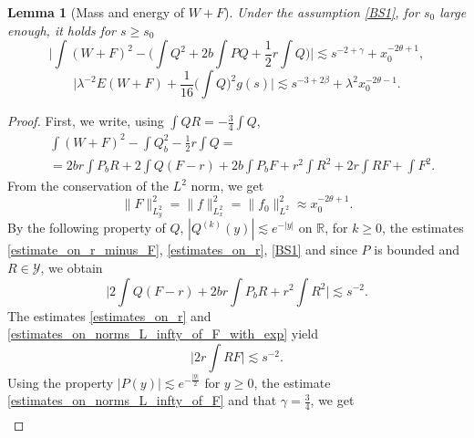 \documentclass[16pt,english, oneside,reqno]{smfart}
\newcommand{\RR}{\mathbb{R}}
\newtheorem{lemma}[theorem]{Lemma}
\begin{document}
\begin{lemma}[Mass and energy of $W+F$]
Under the assumption \eqref{BS1}, for $s_0$ large enough, it holds for $s\geq s_0$
\begin{equation}\label{estimate_on_mass_W_plus_F}
    \bigg\lvert \int (W+F)^2-\Big( \int Q^2 + 2b\int P Q + \frac{1}{2}r \int Q \Big) \bigg\rvert \lesssim s^{-2+\gamma}+x^{-2\theta+1}_0,
\end{equation}
\begin{equation}\label{estimate_on_energy_W_plus_F}
 \bigg\lvert   \lambda^{-2}E(W+F) + \frac{1}{16}\Big( \int Q \Big)^2g(s) \bigg\rvert \lesssim s^{-3+2\beta} + \lambda^2 x^{-2\theta-1}_0.
\end{equation}
    
\end{lemma}
\begin{proof}
    First, we write, using $\int QR=-\frac 34 \int Q$,
    \begin{equation}
    \begin{split}
         &\int (W+F)^2 - \int Q^2_b - \frac{1}{2}r \int Q = \\
         &= 2br\int P_b R + 2\int Q(F-r)+2b\int P_b F + r^2 \int R^2 + 2r \int R F + \int F^2.
    \end{split}
    \end{equation}
    From the conservation of the $L^2$ norm, we get
    \begin{equation}
        \|F\|^2_{L^2_y} = \| f\|^2_{L^2_x} = \|f_0\|^2_{L^2} \approx x^{-2\theta+1}_0.
    \end{equation}
    By the following property of $Q$, $|Q^{(k)}(y)|\lesssim e^{-|y|}$ on $\RR$, for $k \geq 0$, the estimates \eqref{estimate_on_r_minus_F}, \eqref{estimates_on_r}, \eqref{BS1} and since $P$ is bounded and $R \in \mathcal{Y}$, we obtain
    \begin{equation}
        \bigg\lvert 2 \int Q(F-r) + 2br\int P_bR + r^2 \int R^2\bigg\rvert \lesssim s^{-2}.
    \end{equation}
    The estimates \eqref{estimates_on_r} and \eqref{estimates_on_norms_L_infty_of_F_with_exp} yield
    \begin{equation}
        \bigg\lvert 2r\int R F \bigg\rvert \lesssim s^{-2}.
    \end{equation}
    Using the property $|P(y)|\lesssim e^{-\frac{|y|}{2}}$ for $y\geq0$, the estimate \eqref{estimates_on_norms_L_infty_of_F} and that $\gamma=\frac{3}{4}$, we get
    \begin{equation}
    \begin{split}

\end{split}
\end{equation}
\end{proof}
\end{document}
